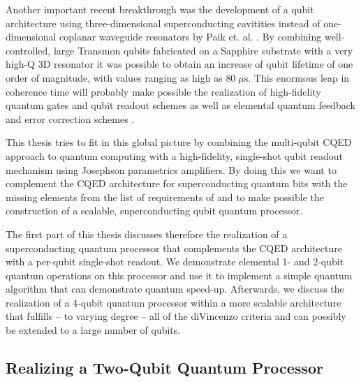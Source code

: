 Another important recent breakthrough was the development of a qubit architecture using three-dimensional superconducting cavitities instead of one-dimensional coplanar waveguide resonators by Paik et. al. \citep{paik_observation_2011}. By combining well-controlled, large Transmon qubits fabricated on a Sapphire substrate with a very high-Q 3D resonator it was possible to obtain an increase of qubit lifetime of one order of magnitude, with values ranging as high as $80 \; \mu \mathrm{s}$. This enormous leap in coherence time will probably make possible the realization of high-fidelity quantum gates and qubit readout schemes as well as elemental quantum feedback and error correction schemes .

This thesis tries to fit in this global picture by combining the multi-qubit CQED approach to quantum computing with a high-fidelity, single-shot qubit readout mechanism using Josephson parametrics amplifiers. By doing this we want to complement the CQED architecture for superconducting quantum bits with the missing elements from the list of requirements of \cite{divincenzo_physical_2000} and to make possible the construction of a scalable, superconducting qubit quantum processor. 

The first part of this thesis discusses therefore the realization of a superconducting quantum processor that complements the CQED architecture with a per-qubit single-shot readout. We demonstrate elemental 1- and 2-qubit quantum operations on this processor and use it to implement a simple quantum algorithm that can demonstrate quantum speed-up. Afterwards, we discuss the realization of a 4-qubit quantum processor within a more scalable architecture that fulfills -- to varying degree -- all of the diVincenzo criteria and can possibly be extended to a large number of qubits.

\subsection{Realizing a Two-Qubit Quantum Processor}

